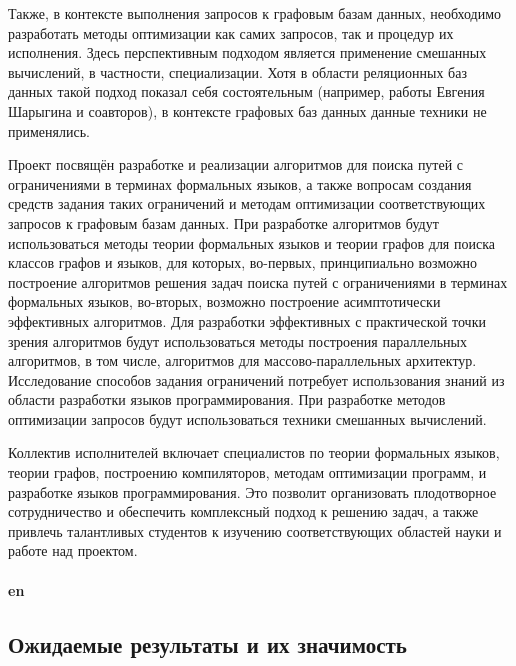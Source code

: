 \documentclass[12pt]{article}  %
\theoremstyle{remark}
\begin{document}
Также, в контексте выполнения запросов к графовым базам данных, необходимо разработать методы оптимизации как самих запросов, так и процедур их исполнения.
Здесь перспективным подходом является применение смешанных вычислений, в частности, специализации.
Хотя в области реляционных баз данных такой подход показал себя состоятельным (например, работы Евгения Шарыгина и соавторов), в контексте графовых баз данных данные техники не применялись.

Проект посвящён разработке и реализации алгоритмов для поиска путей с ограничениями в терминах формальных языков, а также вопросам создания средств задания таких ограничений и методам оптимизации соответствующих запросов к графовым базам данных.
При разработке алгоритмов будут использоваться методы теории формальных языков и теории графов для поиска классов графов и языков, для которых, во-первых, принципиально возможно построение алгоритмов решения задач поиска путей с ограничениями в терминах формальных языков, во-вторых,  возможно построение асимптотически эффективных алгоритмов.
Для разработки эффективных с практической точки зрения алгоритмов будут использоваться методы построения параллельных алгоритмов, в том числе, алгоритмов для массово-параллельных архитектур.
Исследование способов задания ограничений потребует использования знаний из области разработки языков программирования.
При разработке методов оптимизации запросов будут использоваться техники смешанных вычислений.

Коллектив исполнителей включает специалистов по теории формальных языков, теории графов, построению компиляторов, методам оптимизации программ, и разработке языков программирования.
Это позволит организовать плодотворное сотрудничество и обеспечить комплексный подход к решению задач, а также привлечь талантливых студентов к изучению соответствующих областей науки и работе над проектом.
\\
\\
\textbf{en}\\

\subsection{Ожидаемые результаты и их значимость}
\end{document}

